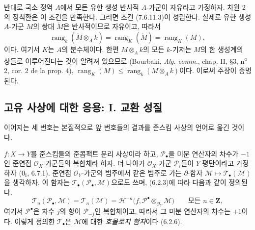 \begin{remark}[7.6.11]
반대로 국소 정역 $A$에서 모든 유한 생성 반사적 $A$-가군이 자유라고
가정하자. 차원 2의 정칙환은 이 조건을 만족한다. 그러면 조건
(7.6.11.3)이 성립한다. 실제로 유한 생성 $A$-가군 $M$의 쌍대
$\check M$은 반사적이므로 자유이고, 따라서
\[
  \operatorname{rang}_k(\check M\otimes_A k)
  =
  \operatorname{rang}_K(\check M)
  =
  \operatorname{rang}_K(M),
\]
이다. 여기서 $K$는 $A$의 분수체이다. 한편 $M\otimes_A k$의 모든
$k$-기저는 $M$의 한 생성계의 상들로 이루어진다는 것이 알려져 있으므로
(Bourbaki, \emph{Alg. comm.}, chap. II, \S 3,
n\textsuperscript{o} 2, cor. 2 de la prop. 4),
$\operatorname{rang}_K(M)\leq\operatorname{rang}_k(M\otimes_A k)$이다.
이로써 주장이 증명된다.
\end{remark}

\subsection{고유 사상에 대한 응용: I. 교환 성질}
\label{subsection:III.7.7.fr}

이어지는 세 번호는 본질적으로 앞 번호들의 결과를 준스킴 사상의 언어로
옮긴 것이다.

\begin{env}[7.7.1]
\label{III.7.7.1-fr}
$f:X\to Y$를 준스킴들의 준콤팩트 분리 사상이라 하고,
$\mathscr P_\bullet$을 미분 연산자의 차수가 $-1$인 준연접
$\mathscr O_X$-가군들의 복합체라 하자. 더 나아가
$\mathscr O_X$-가군 $\mathscr P_i$들이 $Y$-평탄이라고 가정하자
($0_{\mathrm I}$, 6.7.1).
준연접 $\mathscr O_Y$-가군의 범주에서 같은 범주로 가는 $\partial$-함자
$\mathscr M\mapsto\mathscr T_\bullet(\mathscr M)$을 생각하자. 이 함자는
$\mathscr T_\bullet(\mathscr P_\bullet,\mathscr M)$으로도 쓰며,
(6.2.3)에 따라 다음과 같이 정의된다.
\[
  \mathscr T_n(\mathscr P_\bullet,\mathscr M)
  =\mathscr T_n(\mathscr M)
  =\mathscr H^{-n}
    \bigl(f,\mathscr P^\bullet\otimes_{\mathscr O_Y}\mathscr M\bigr)
  \qquad\text{모든 }n\in\mathbf Z,
  \tag{7.7.1.1}\label{III.7.7.1.1.fr}
\]
여기서 $\mathscr P^\bullet$은 차수 $j$의 항이 $\mathscr P_{-j}$인
복합체이고, 따라서 그 미분 연산자의 차수는 $+1$이다. 이렇게 정의한
$\mathscr T_\bullet$은 $\mathscr M$에 대한 \emph{호몰로지 함자}이다
(6.2.6).
\end{env}

